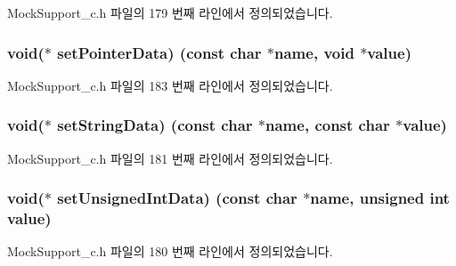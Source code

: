 Mock\+Support\+\_\+c.\+h 파일의 179 번째 라인에서 정의되었습니다.

\subsubsection[{\texorpdfstring{set\+Pointer\+Data}{setPointerData}}]{\setlength{\rightskip}{0pt plus 5cm}void($\ast$ set\+Pointer\+Data) (const char $\ast$name, void $\ast$value)}\hypertarget{struct_s_mock_support__c_a871981311b71da59a485cca9e9a14733}{}\label{struct_s_mock_support__c_a871981311b71da59a485cca9e9a14733}


Mock\+Support\+\_\+c.\+h 파일의 183 번째 라인에서 정의되었습니다.

\subsubsection[{\texorpdfstring{set\+String\+Data}{setStringData}}]{\setlength{\rightskip}{0pt plus 5cm}void($\ast$ set\+String\+Data) (const char $\ast$name, const char $\ast$value)}\hypertarget{struct_s_mock_support__c_af18cdda96bda5cf110b3d3a4bd5f6acd}{}\label{struct_s_mock_support__c_af18cdda96bda5cf110b3d3a4bd5f6acd}


Mock\+Support\+\_\+c.\+h 파일의 181 번째 라인에서 정의되었습니다.

\subsubsection[{\texorpdfstring{set\+Unsigned\+Int\+Data}{setUnsignedIntData}}]{\setlength{\rightskip}{0pt plus 5cm}void($\ast$ set\+Unsigned\+Int\+Data) (const char $\ast$name, unsigned int value)}\hypertarget{struct_s_mock_support__c_a5778dd0c295cc54fb673f2f8353d2457}{}\label{struct_s_mock_support__c_a5778dd0c295cc54fb673f2f8353d2457}


Mock\+Support\+\_\+c.\+h 파일의 180 번째 라인에서 정의되었습니다.

